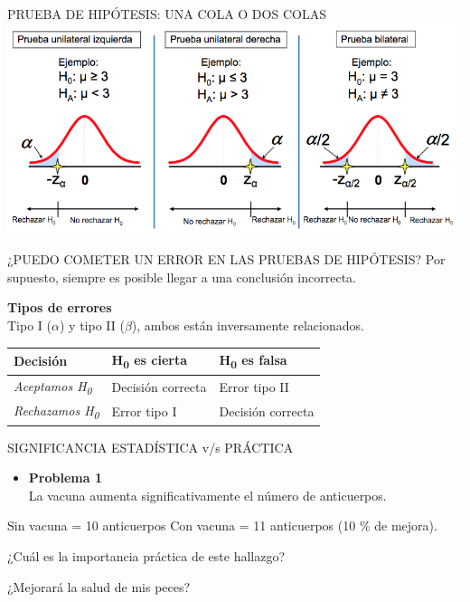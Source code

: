 \documentclass[
  ignorenonframetext,
]{beamer}
\providecommand{\tightlist}{%
  \setlength{\itemsep}{0pt}\setlength{\parskip}{0pt}}
\begin{document}
\begin{frame}{PRUEBA DE HIPÓTESIS: UNA COLA O DOS COLAS}
\protect\hypertarget{prueba-de-hipuxf3tesis-una-cola-o-dos-colas}{}
\includegraphics[width=1\linewidth]{region_rechazo}
\end{frame}

\begin{frame}{¿PUEDO COMETER UN ERROR EN LAS PRUEBAS DE HIPÓTESIS?}
\protect\hypertarget{puedo-cometer-un-error-en-las-pruebas-de-hipuxf3tesis}{}
Por supuesto, siempre es posible llegar a una conclusión incorrecta.

\textbf{Tipos de errores}\\
Tipo I (\(\alpha\)) y tipo II (\(\beta\)), ambos están inversamente
relacionados.

\begin{longtable}[]{@{}lll@{}}
\toprule
\textbf{Decisión} & \textbf{H\textsubscript{0} es cierta} &
\textbf{H\textsubscript{0} es falsa}\tabularnewline
\midrule
\endhead
\emph{Aceptamos H\textsubscript{0}} & Decisión correcta & Error tipo
II\tabularnewline
\emph{Rechazamos H\textsubscript{0}} & Error tipo I & Decisión
correcta\tabularnewline
\bottomrule
\end{longtable}
\end{frame}

\begin{frame}{SIGNIFICANCIA ESTADÍSTICA v/s PRÁCTICA}
\protect\hypertarget{significancia-estaduxedstica-vs-pruxe1ctica}{}
\begin{itemize}
\tightlist
\item
  \textbf{Problema 1}\\
  La vacuna aumenta significativamente el número de anticuerpos.
\end{itemize}

Sin vacuna = 10 anticuerpos Con vacuna = 11 anticuerpos (10 \% de
mejora).

¿Cuál es la importancia práctica de este hallazgo?

¿Mejorará la salud de mis peces?
\end{frame}
\end{document}

